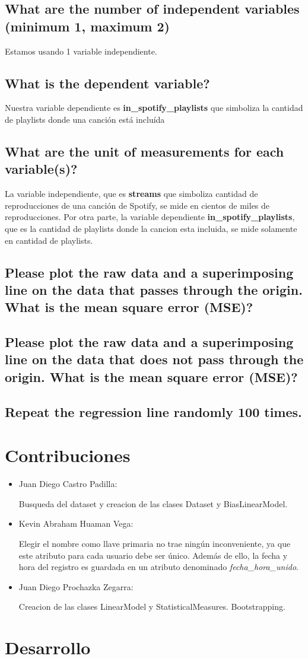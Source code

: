 \documentclass{report}
\begin{document}
        \section{What are the number of independent variables (minimum 1, maximum 2)}
            Estamos usando 1 variable independiente.
        \section{What is the dependent variable?}
            Nuestra variable dependiente es \textbf{in_spotify_playlists} que simboliza la cantidad de playlists donde una canci\'on est\'a inclu\'ida
        \section{What are the unit of measurements for each variable(s)?}
            La variable independiente, que es \textbf{streams} que simboliza cantidad de reproducciones de una canci\'on de Spotify, se mide en cientos de miles de reproducciones. Por otra parte, la variable dependiente \textbf{in_spotify_playlists}, que es la cantidad de playlists donde la cancion esta incluida, se mide solamente en cantidad de playlists.
        \section{Please plot the raw data and a superimposing line on the data that passes through the origin. What is the mean square error (MSE)?}
        \section{Please plot the raw data and a superimposing line on the data that does not pass through the origin. What is the mean square error (MSE)?}
        \section{Repeat the regression line randomly 100 times.}
    \chapter{Contribuciones}
        \begin{itemize}
            \item Juan Diego Castro Padilla:

            Busqueda del dataset y creacion de las clases Dataset y BiasLinearModel.
            \item Kevin Abraham Huaman Vega:

            Elegir el nombre como llave primaria no trae ningún inconveniente, ya que este atributo para cada usuario debe ser único. Además de ello, la fecha y hora del registro es guardada en un atributo denominado \emph{fecha_hora_unido}.

            \item Juan Diego Prochazka Zegarra:

            Creacion de las clases LinearModel y StatisticalMeasures. Bootstrapping.

            \end{itemize}
    \chapter{Desarrollo}
\end{document}
